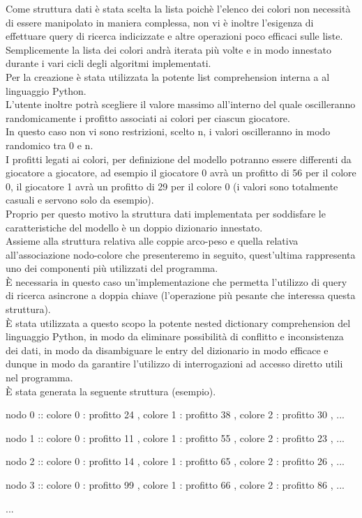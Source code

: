 Come struttura dati è stata scelta la lista poichè l'elenco dei colori non necessità di essere manipolato in maniera complessa, non vi è inoltre l'esigenza di effettuare query di ricerca indicizzate e altre operazioni poco efficaci sulle liste.\\
Semplicemente la lista dei colori andrà iterata più volte e in modo innestato durante i vari cicli degli algoritmi implementati.\\
Per la creazione è stata utilizzata la potente list comprehension interna a al linguaggio Python.\\

L'utente inoltre potrà scegliere il valore massimo all'interno del quale oscilleranno randomicamente i profitto associati ai colori per ciascun giocatore.\\
In questo caso non vi sono restrizioni, scelto n, i valori oscilleranno in modo randomico tra 0 e n.\\
I profitti legati ai colori, per definizione del modello potranno essere differenti da giocatore a giocatore, ad esempio il giocatore 0 avrà un profitto di 56 per il colore 0, il giocatore 1 avrà un profitto di 29 per il colore 0 (i valori sono totalmente casuali e servono solo da esempio).\\

Proprio per questo motivo la struttura dati implementata per soddisfare le caratteristiche del modello è un doppio dizionario innestato.\\
Assieme alla struttura relativa alle coppie arco-peso e quella relativa all'associazione nodo-colore che presenteremo in seguito, quest'ultima rappresenta uno dei componenti più utilizzati del programma.\\
È necessaria in questo caso un'implementazione che permetta l'utilizzo di query di ricerca asincrone a doppia chiave (l'operazione più pesante che interessa questa struttura).\\
È stata utilizzata a questo scopo la potente nested dictionary comprehension del linguaggio Python, in modo da eliminare possibilità di conflitto e inconsistenza dei dati, in modo da disambiguare le entry del dizionario in modo efficace e dunque in modo da garantire l'utilizzo di interrogazioni ad accesso diretto utili nel programma.\\
È stata generata la seguente struttura (esempio).

\begin{description}
	\item nodo 0 :: colore 0 : profitto 24 , colore 1 : profitto 38 , colore 2 : profitto 30 , ...
	\item nodo 1 :: colore 0 : profitto 11 , colore 1 : profitto 55 , colore 2 : profitto 23 , ...
	\item nodo 2 :: colore 0 : profitto 14 , colore 1 : profitto 65 , colore 2 : profitto 26 , ...
	\item nodo 3 :: colore 0 : profitto 99 , colore 1 : profitto 66 , colore 2 : profitto 86 , ...
	\item ...
\end{description}


